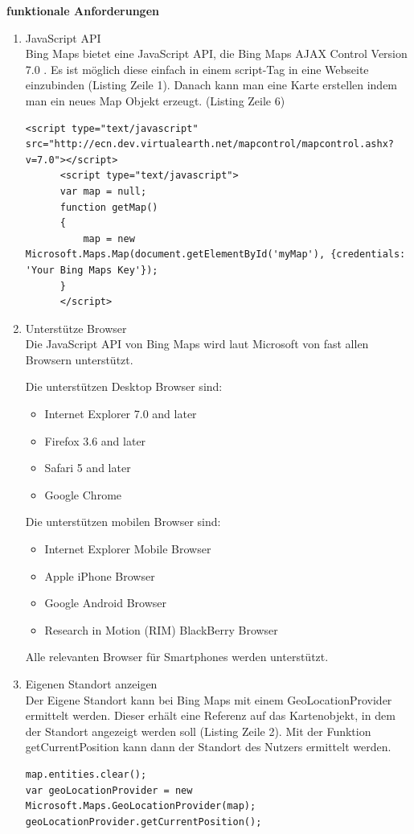 \textbf{funktionale Anforderungen}
\begin{enumerate}
\item JavaScript API\\
Bing Maps bietet eine JavaScript API, die \glqq Bing Maps AJAX Control Version 7.0 \grqq. Es ist möglich diese einfach in einem script-Tag in eine Webseite einzubinden (Listing Zeile 1). Danach kann man eine Karte erstellen indem man ein neues Map Objekt erzeugt. (Listing Zeile 6) 
\begin{lstlisting}
<script type="text/javascript" src="http://ecn.dev.virtualearth.net/mapcontrol/mapcontrol.ashx?v=7.0"></script>
      <script type="text/javascript">
      var map = null;
      function getMap()
      {
          map = new Microsoft.Maps.Map(document.getElementById('myMap'), {credentials: 'Your Bing Maps Key'});
      }   
      </script>
\end{lstlisting} \cite[Codebeispiel CreateMap1]{bingmaps}


\item Unterstütze Browser\\
Die JavaScript API von Bing Maps wird laut Microsoft von fast allen Browsern unterstützt. 

Die unterstützen Desktop Browser sind:

\glqq
\begin{itemize}
\item Internet Explorer 7.0 and later
\item Firefox 3.6 and later
\item Safari 5 and later
\item Google Chrome
\end{itemize}

Die unterstützen mobilen Browser sind:
\begin{itemize}
\item Internet Explorer Mobile Browser
\item Apple iPhone Browser
\item Google Android Browser
\item Research in Motion (RIM) BlackBerry Browser
\end{itemize}
\grqq \cite{microsoftbrowser}

Alle relevanten Browser für Smartphones werden unterstützt.

\item Eigenen Standort anzeigen\\
Der Eigene Standort kann bei Bing Maps mit einem \glqq GeoLocationProvider \grqq ermittelt werden. Dieser erhält eine Referenz auf das Kartenobjekt, in dem der Standort angezeigt werden soll (Listing Zeile 2). Mit der Funktion \glqq getCurrentPosition \grqq kann dann der Standort des Nutzers ermittelt werden.
\begin{lstlisting}
map.entities.clear(); 
var geoLocationProvider = new Microsoft.Maps.GeoLocationProvider(map);  
geoLocationProvider.getCurrentPosition(); 
\end{lstlisting}\cite[Codebeispiel GetUserLocation1]{bingmaps}


\end{enumerate}
